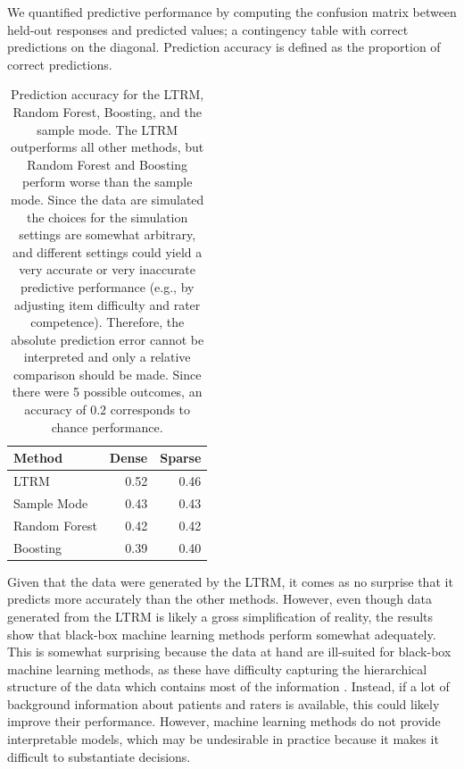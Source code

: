 \documentclass[a4paper,usenames,dvipsnames]{article}
\newenvironment{revision}{\color{teal}}{\color{black}}
\begin{document}
We quantified predictive performance by computing the confusion matrix between held-out responses and predicted values; a contingency table with correct predictions on the diagonal. Prediction accuracy is defined as the \begin{revision}proportion of correct predictions\end{revision}.

\begin{table}[!ht]
	\centering
	\caption{Prediction accuracy for the LTRM, Random Forest, Boosting, and the sample mode. The LTRM outperforms all other methods, but Random Forest and Boosting perform worse than the sample mode. Since the data are simulated the choices for the simulation settings are somewhat arbitrary, and different settings could yield a very accurate or very inaccurate predictive performance (e.g., by adjusting item difficulty and rater competence). Therefore, the absolute prediction error cannot be interpreted and only a relative comparison should be made. Since there were 5 possible outcomes, an accuracy of $0.2$ corresponds to chance performance.}
	\begin{tabular}{lrr}
		\toprule
		Method        & Dense & Sparse \\
		\midrule
		LTRM          & 0.52  & 0.46 \\
		Sample Mode   & 0.43  & 0.43 \\
		Random Forest & 0.42  & 0.42 \\
		Boosting      & 0.39  & 0.40 \\
		\bottomrule
	\end{tabular}
\end{table}
Given that the data were generated by the LTRM, it comes as no surprise that it predicts more accurately than the other methods. However, even though data generated from the LTRM is likely a gross simplification of reality, the results show that black-box machine learning methods perform somewhat adequately. This is somewhat surprising because the data at hand are ill-suited for black-box machine learning methods, as these have difficulty capturing the hierarchical structure of the data which contains most of the information \cite<but see>{hajjem2014mixed}. Instead, if a lot of background information about patients and raters is available, this could likely improve their performance. However, machine learning methods do not provide interpretable models, which may be undesirable in practice because it makes it difficult to substantiate decisions. 
 
\end{document}
